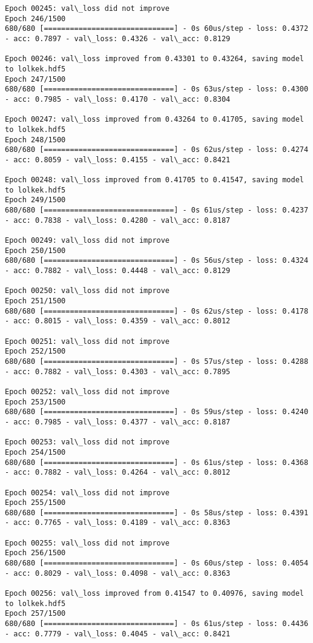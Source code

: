 \documentclass[11pt]{article}
\begin{document}
\begin{Verbatim}[commandchars=\\\{\}]
Epoch 00245: val\_loss did not improve
Epoch 246/1500
680/680 [==============================] - 0s 60us/step - loss: 0.4372 - acc: 0.7897 - val\_loss: 0.4326 - val\_acc: 0.8129

Epoch 00246: val\_loss improved from 0.43301 to 0.43264, saving model to lolkek.hdf5
Epoch 247/1500
680/680 [==============================] - 0s 63us/step - loss: 0.4300 - acc: 0.7985 - val\_loss: 0.4170 - val\_acc: 0.8304

Epoch 00247: val\_loss improved from 0.43264 to 0.41705, saving model to lolkek.hdf5
Epoch 248/1500
680/680 [==============================] - 0s 62us/step - loss: 0.4274 - acc: 0.8059 - val\_loss: 0.4155 - val\_acc: 0.8421

Epoch 00248: val\_loss improved from 0.41705 to 0.41547, saving model to lolkek.hdf5
Epoch 249/1500
680/680 [==============================] - 0s 61us/step - loss: 0.4237 - acc: 0.7838 - val\_loss: 0.4280 - val\_acc: 0.8187

Epoch 00249: val\_loss did not improve
Epoch 250/1500
680/680 [==============================] - 0s 56us/step - loss: 0.4324 - acc: 0.7882 - val\_loss: 0.4448 - val\_acc: 0.8129

Epoch 00250: val\_loss did not improve
Epoch 251/1500
680/680 [==============================] - 0s 62us/step - loss: 0.4178 - acc: 0.8015 - val\_loss: 0.4359 - val\_acc: 0.8012

Epoch 00251: val\_loss did not improve
Epoch 252/1500
680/680 [==============================] - 0s 57us/step - loss: 0.4288 - acc: 0.7882 - val\_loss: 0.4303 - val\_acc: 0.7895

Epoch 00252: val\_loss did not improve
Epoch 253/1500
680/680 [==============================] - 0s 59us/step - loss: 0.4240 - acc: 0.7985 - val\_loss: 0.4377 - val\_acc: 0.8187

Epoch 00253: val\_loss did not improve
Epoch 254/1500
680/680 [==============================] - 0s 61us/step - loss: 0.4368 - acc: 0.7882 - val\_loss: 0.4264 - val\_acc: 0.8012

Epoch 00254: val\_loss did not improve
Epoch 255/1500
680/680 [==============================] - 0s 58us/step - loss: 0.4391 - acc: 0.7765 - val\_loss: 0.4189 - val\_acc: 0.8363

Epoch 00255: val\_loss did not improve
Epoch 256/1500
680/680 [==============================] - 0s 60us/step - loss: 0.4054 - acc: 0.8029 - val\_loss: 0.4098 - val\_acc: 0.8363

Epoch 00256: val\_loss improved from 0.41547 to 0.40976, saving model to lolkek.hdf5
Epoch 257/1500
680/680 [==============================] - 0s 61us/step - loss: 0.4436 - acc: 0.7779 - val\_loss: 0.4045 - val\_acc: 0.8421


\end{Verbatim}
\end{document}
